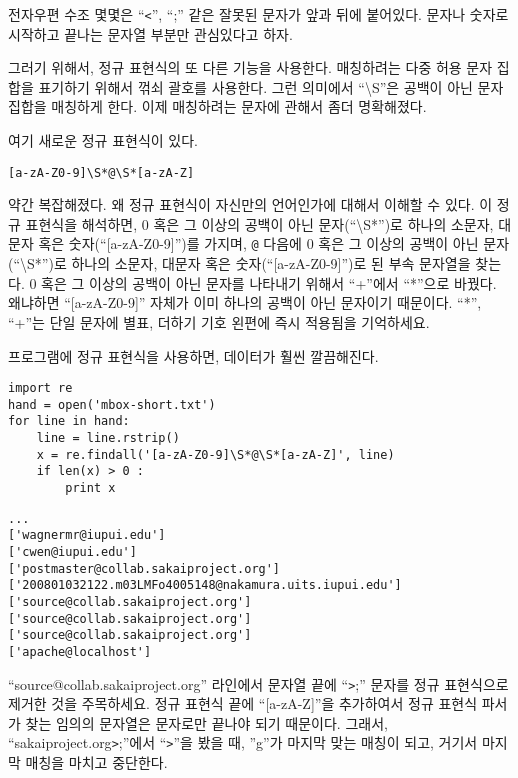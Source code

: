 전자우편 수조 몇몇은 ``\verb"<"'', ``;'' 같은 잘못된 문자가 앞과 뒤에 붙어있다.
문자나 숫자로 시작하고 끝나는 문자열 부분만 관심있다고 하자.

그러기 위해서, 정규 표현식의 또 다른 기능을 사용한다. 매칭하려는 다중 허용 문자 집합을 표기하기 위해서 꺾쇠 괄호를 사용한다. 
그런 의미에서 ``{\textbackslash}S''은 공백이 아닌 문자 집합을 매칭하게 한다. 이제 매칭하려는 문자에 관해서 좀더 명확해졌다.

여기 새로운 정규 표현식이 있다.

\beforeverb
\begin{verbatim}
[a-zA-Z0-9]\S*@\S*[a-zA-Z]
\end{verbatim}
\afterverb
%

약간 복잡해졌다. 왜 정규 표현식이 자신만의 언어인가에 대해서 이해할 수 있다. 이 정규 표현식을 해석하면, 
0 혹은 그 이상의 공백이 아닌 문자(``{\textbackslash}S*'')로 하나의 소문자, 대문자 혹은 숫자(``[a-zA-Z0-9]'')를 가지며, {\verb"@"} 다음에 
0 혹은 그 이상의 공백이 아닌 문자(``{\textbackslash}S*'')로 하나의 소문자, 대문자 혹은 숫자(``[a-zA-Z0-9]'')로 된 부속 문자열을 찾는다.
0 혹은 그 이상의 공백이 아닌 문자를 나타내기 위해서 ``+''에서 ``*''으로 바꿨다. 왜냐하면 ``[a-zA-Z0-9]'' 자체가 이미 하나의 공백이 아닌 문자이기 때문이다.
``*'', ``+''는 단일 문자에 별표, 더하기 기호 왼편에 즉시 적용됨을 기억하세요.


프로그램에 정규 표현식을 사용하면, 데이터가 훨씬 깔끔해진다.

\beforeverb
\begin{verbatim}
import re
hand = open('mbox-short.txt')
for line in hand:
    line = line.rstrip()
    x = re.findall('[a-zA-Z0-9]\S*@\S*[a-zA-Z]', line)
    if len(x) > 0 :
        print x
\end{verbatim}
\afterverb
%

\beforeverb
\begin{verbatim}
...
['wagnermr@iupui.edu']
['cwen@iupui.edu']
['postmaster@collab.sakaiproject.org']
['200801032122.m03LMFo4005148@nakamura.uits.iupui.edu']
['source@collab.sakaiproject.org']
['source@collab.sakaiproject.org']
['source@collab.sakaiproject.org']
['apache@localhost']
\end{verbatim}
\afterverb
%

``source@collab.sakaiproject.org'' 라인에서 문자열 끝에 ``\verb">";'' 문자를 정규 표현식으로 제거한 것을 주목하세요.
정규 표현식 끝에 ``[a-zA-Z]''을 추가하여서 정규 표현식 파서가 찾는 임의의 문자열은 문자로만 끝나야 되기 때문이다.
그래서, ``sakaiproject.org\verb">";''에서 ``\verb">"''을 봤을 때, ''g''가 마지막 맞는 매칭이 되고, 거기서 마지막 매칭을 마치고 중단한다.

